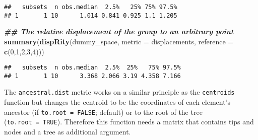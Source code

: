 \documentclass[
]{book}
\newenvironment{Shaded}{\begin{snugshade}}{\end{snugshade}}
\newcommand{\AttributeTok}[1]{\textcolor[rgb]{0.13,0.29,0.53}{#1}}
\newcommand{\DecValTok}[1]{\textcolor[rgb]{0.00,0.00,0.81}{#1}}
\newcommand{\DocumentationTok}[1]{\textcolor[rgb]{0.56,0.35,0.01}{\textbf{\textit{#1}}}}
\newcommand{\FunctionTok}[1]{\textcolor[rgb]{0.13,0.29,0.53}{\textbf{#1}}}
\newcommand{\NormalTok}[1]{#1}
\newcommand{\OtherTok}[1]{\textcolor[rgb]{0.56,0.35,0.01}{#1}}
\newcommand{\SpecialCharTok}[1]{\textcolor[rgb]{0.81,0.36,0.00}{\textbf{#1}}}
\newcommand{\StringTok}[1]{\textcolor[rgb]{0.31,0.60,0.02}{#1}}
\begin{document}
\begin{verbatim}
##   subsets  n obs.median  2.5%   25% 75% 97.5%
## 1       1 10      1.014 0.841 0.925 1.1 1.205
\end{verbatim}

\begin{Shaded}
\begin{Highlighting}[]
\DocumentationTok{\#\# The relative displacement of the group to an arbitrary point}
\FunctionTok{summary}\NormalTok{(}\FunctionTok{dispRity}\NormalTok{(dummy\_space, }\AttributeTok{metric =}\NormalTok{ displacements,}
                 \AttributeTok{reference =} \FunctionTok{c}\NormalTok{(}\DecValTok{0}\NormalTok{,}\DecValTok{1}\NormalTok{,}\DecValTok{2}\NormalTok{,}\DecValTok{3}\NormalTok{,}\DecValTok{4}\NormalTok{)))}
\end{Highlighting}
\end{Shaded}

\begin{verbatim}
##   subsets  n obs.median  2.5%  25%   75% 97.5%
## 1       1 10      3.368 2.066 3.19 4.358 7.166
\end{verbatim}

The \texttt{ancestral.dist} metric works on a similar principle as the \texttt{centroids} function but changes the centroid to be the coordinates of each element's ancestor (if \texttt{to.root\ =\ FALSE}; default) or to the root of the tree (\texttt{to.root\ =\ TRUE}).
Therefore this function needs a matrix that contains tips and nodes and a tree as additional argument.

\begin{Shaded}
\end{Shaded}
\end{document}
